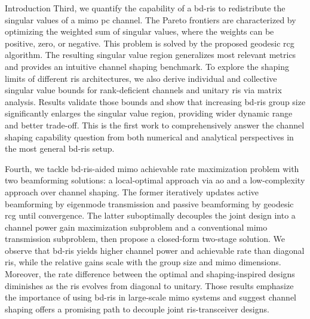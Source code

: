 \begin{section}{Introduction}
	Third, we quantify the capability of a \gls{bd}-\gls{ris} to redistribute the singular values of a \gls{mimo} \gls{pc} channel.
	The {Pareto frontiers} are characterized by optimizing the {weighted sum of singular values}, where the weights can be positive, zero, or negative.
	This problem is solved by the proposed geodesic \gls{rcg} algorithm.
	The resulting singular value region generalizes most relevant metrics and provides an intuitive channel shaping benchmark.
	To explore the shaping limits of different \gls{ris} architectures, we also derive individual and collective singular value bounds for rank-deficient channels and unitary \gls{ris} via matrix analysis.
	Results validate those bounds and show that increasing \gls{bd}-\gls{ris} group size significantly enlarges the singular value region, providing wider dynamic range and better trade-off.
	This is the first work to comprehensively answer the channel shaping capability question from both numerical and analytical perspectives in the most general \gls{bd}-\gls{ris} setup.

	Fourth, we tackle \gls{bd}-\gls{ris}-aided \gls{mimo} achievable rate maximization problem with two beamforming solutions: a local-optimal approach via \gls{ao} and a low-complexity approach over channel shaping.
	The former iteratively updates active beamforming by eigenmode transmission and passive beamforming by geodesic \gls{rcg} until convergence.
	The latter suboptimally decouples the joint design into a channel power gain maximization subproblem and a conventional \gls{mimo} transmission subproblem, then propose a closed-form two-stage solution.
	We observe that \gls{bd}-\gls{ris} yields higher channel power and achievable rate than diagonal \gls{ris}, while the relative gains scale with the group size and \gls{mimo} dimensions.
	Moreover, the rate difference between the optimal and shaping-inspired designs diminishes as the \gls{ris} evolves from diagonal to unitary.
	Those results emphasize the importance of using \gls{bd}-\gls{ris} in large-scale \gls{mimo} systems and suggest channel shaping offers a promising path to decouple joint \gls{ris}-transceiver designs.


\end{section}

